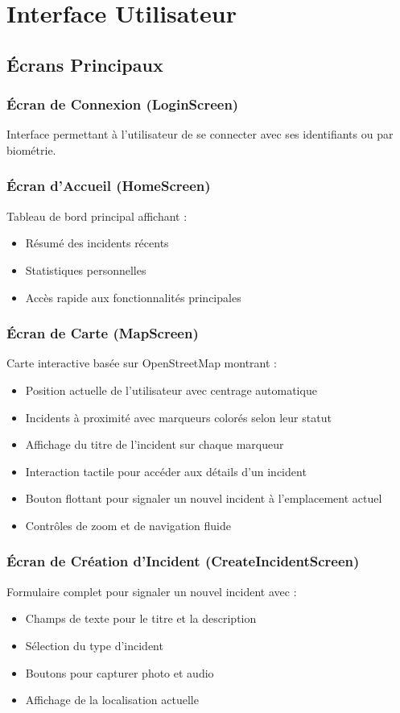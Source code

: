 \documentclass[12pt,a4paper]{article}
\begin{document}
\section{Interface Utilisateur}

\subsection{Écrans Principaux}

\subsubsection{Écran de Connexion (LoginScreen)}
Interface permettant à l'utilisateur de se connecter avec ses identifiants ou par biométrie.

\subsubsection{Écran d'Accueil (HomeScreen)}
Tableau de bord principal affichant :
\begin{itemize}
    \item Résumé des incidents récents
    \item Statistiques personnelles
    \item Accès rapide aux fonctionnalités principales
\end{itemize}

\subsubsection{Écran de Carte (MapScreen)}
Carte interactive basée sur OpenStreetMap montrant :
\begin{itemize}
    \item Position actuelle de l'utilisateur avec centrage automatique
    \item Incidents à proximité avec marqueurs colorés selon leur statut
    \item Affichage du titre de l'incident sur chaque marqueur
    \item Interaction tactile pour accéder aux détails d'un incident
    \item Bouton flottant pour signaler un nouvel incident à l'emplacement actuel
    \item Contrôles de zoom et de navigation fluide
\end{itemize}

\subsubsection{Écran de Création d'Incident (CreateIncidentScreen)}
Formulaire complet pour signaler un nouvel incident avec :
\begin{itemize}
    \item Champs de texte pour le titre et la description
    \item Sélection du type d'incident
    \item Boutons pour capturer photo et audio
    \item Affichage de la localisation actuelle
\end{itemize}
\end{document}
